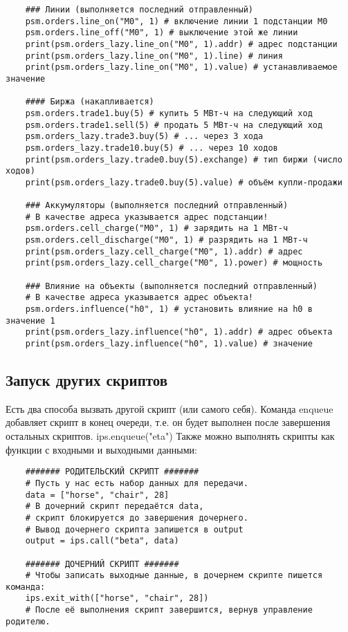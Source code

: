 \begin{verbatim}
    ### Линии (выполняется последний отправленный) 
    psm.orders.line_on("M0", 1) # включение линии 1 подстанции M0 
    psm.orders.line_off("M0", 1) # выключение этой же линии 
    print(psm.orders_lazy.line_on("M0", 1).addr) # адрес подстанции 
    print(psm.orders_lazy.line_on("M0", 1).line) # линия 
    print(psm.orders_lazy.line_on("M0", 1).value) # устанавливаемое значение 

    #### Биржа (накапливается) 
    psm.orders.trade1.buy(5) # купить 5 МВт-ч на следующий ход 
    psm.orders.trade1.sell(5) # продать 5 МВт-ч на следующий ход 
    psm.orders_lazy.trade3.buy(5) # ... через 3 хода 
    psm.orders_lazy.trade10.buy(5) # ... через 10 ходов 
    print(psm.orders_lazy.trade0.buy(5).exchange) # тип биржи (число ходов) 
    print(psm.orders_lazy.trade0.buy(5).value) # объём купли-продажи 

    ### Аккумуляторы (выполняется последний отправленный) 
    # В качестве адреса указывается адрес подстанции! 
    psm.orders.cell_charge("M0", 1) # зарядить на 1 МВт-ч 
    psm.orders.cell_discharge("M0", 1) # разрядить на 1 МВт-ч 
    print(psm.orders_lazy.cell_charge("M0", 1).addr) # адрес 
    print(psm.orders_lazy.cell_charge("M0", 1).power) # мощность 

    ### Влияние на объекты (выполняется последний отправленный) 
    # В качестве адреса указывается адрес объекта! 
    psm.orders.influence("h0", 1) # установить влияние на h0 в значение 1 
    print(psm.orders_lazy.influence("h0", 1).addr) # адрес объекта 
    print(psm.orders_lazy.influence("h0", 1).value) # значение 
\end{verbatim}

\subsection*{Запуск других скриптов}

Есть два способа вызвать другой скрипт (или самого себя). Команда enqueue добавляет скрипт в конец очереди, т.е. он будет выполнен после завершения остальных скриптов. 
ips.enqueue("eta") 
Также можно выполнять скрипты как функции с входными и выходными данными: 

\begin{verbatim}
    ####### РОДИТЕЛЬСКИЙ СКРИПТ ####### 
    # Пусть у нас есть набор данных для передачи. 
    data = ["horse", "chair", 28] 
    # В дочерний скрипт передаётся data, 
    # скрипт блокируется до завершения дочернего. 
    # Вывод дочернего скрипта запишется в output 
    output = ips.call("beta", data) 

    ####### ДОЧЕРНИЙ СКРИПТ ####### 
    # Чтобы записать выходные данные, в дочернем скрипте пишется команда: 
    ips.exit_with(["horse", "chair", 28]) 
    # После её выполнения скрипт завершится, вернув управление родителю. 
\end{verbatim}
    
